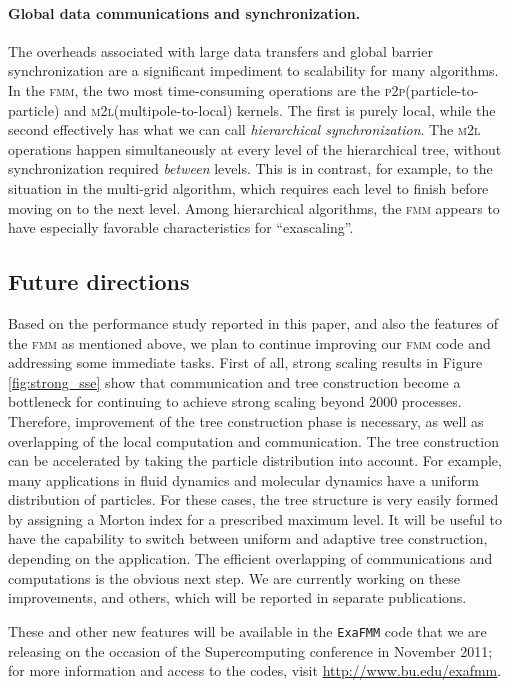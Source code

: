 \documentclass[10pt,twocolumn]{article}
\newcommand{\fmm}{\textsc{fmm}\xspace}
\newcommand{\ML}{\textsc{m}2\textsc{l}\xspace}
\newcommand{\PP}{\textsc{p}2\textsc{p}\xspace}
\newlength{\up}
\begin{document}
\vspace{\up}
\paragraph{Global data communications and synchronization.}The overheads associated with large data transfers and global barrier synchronization are a significant impediment to scalability for many algorithms.  In the \fmm, the two most time-consuming operations are the \PP (particle-to-particle) and \ML (multipole-to-local) kernels.  The first is purely local, while the second effectively has what we can call \emph{hierarchical synchronization}.  The \ML operations happen simultaneously at every level of the hierarchical tree, without synchronization required \emph{between} levels.  This is in contrast, for example, to the situation in the multi-grid algorithm, which requires each level to finish before moving on to the next level. Among hierarchical algorithms, the \fmm appears to have especially favorable characteristics for ``exascaling''.


\subsection*{Future directions}

Based on the performance study reported in this paper, and also the features of the \fmm as mentioned above, we plan to continue improving our \fmm code and addressing some immediate tasks. First of all, strong scaling results in Figure \ref{fig:strong_sse} show that communication and tree construction become a bottleneck for continuing to achieve strong scaling beyond 2000 processes. Therefore, improvement of the tree construction phase is necessary, as well as overlapping of the local computation and communication. The tree construction can be accelerated by taking the particle distribution into account. For example, many applications in fluid dynamics and molecular dynamics have a uniform distribution of particles. For these cases, the tree structure is very easily formed by assigning a Morton index for a prescribed maximum level. It will be useful to have the capability to switch between uniform and adaptive tree construction, depending on the application. 
The efficient overlapping of communications and computations is the obvious next step. We are currently working on these improvements, and others, which will be reported in separate publications. 

These and other new features will be available in the \texttt{ExaFMM} code that we are releasing on the occasion of the Supercomputing conference in November 2011; for more information and access to the codes, visit \href{http://www-test.bu.edu/exafmm}{http://www.bu.edu/exafmm}.
\end{document}
